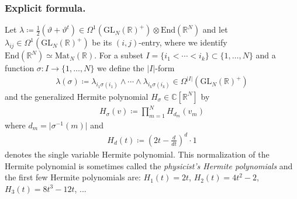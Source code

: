 \documentclass[a4paper,11pt]{amsart} %
\newcommand{\8}{\infty}
\newcommand{\GL}{\mathrm{GL}}
\newcommand{\R}{\mathbb{R}}
\newcommand{\C}{\mathbb{C}}
\newcommand{\End}{\mathrm{End}}
\newcommand{\Mat}{\mathrm{Mat}}
\theoremstyle{mytheoremstyle}
\theoremstyle{remark}
\numberwithin{equation}{section}
\begin{document}
\subsubsection{Explicit formula.} Let $\lambda \coloneqq \frac{1}{2}(\vartheta+\vartheta^t) \in \Omega^1(\GL_N(\R)^+) \otimes \End(\R^{N})$ and let $\lambda_{ij} \in \Omega^1(\GL_N(\R)^+)$ be its $(i,j)$-entry, where we identify $\End(\R^{N}) \simeq \Mat_N(\R)$. For a subset $I=\{i_1 < \cdots <i_k\} \subset \{ 1, \dots, N \}$ and a function $\sigma \colon I \longrightarrow \{ 1, \dots, N \}$ we define the $\vert I \vert$-form
\begin{align}
    \lambda(\sigma) \coloneqq \lambda_{i_1\sigma(i_1)} \wedge  \cdots \wedge \lambda_{i_k\sigma(i_k)} \in \Omega^{\vert I \vert}(\GL_N(\R)^+)
\end{align}
and the generalized Hermite polynomial $H_\sigma \in \C[\R^{N}]$ by
\begin{align}
    H_\sigma(v)  \coloneqq \prod_{m=1}^NH_{d_m}(v_m)
\end{align}
where $d_m = \vert \sigma^{-1}(m) \vert$ and 
\begin{align}
H_d(t) \coloneqq \left (2t-\frac{d}{dt} \right )^d \cdot 1
\end{align} denotes the single variable Hermite polynomial.  This normalization of the Hermite polynomial is sometimes called the {\em physicist's Hermite polynomials} and the first few Hermite polynomials are: $H_1(t)=2t$, $H_2(t)=4t^2-2$, $H_3(t)=8t^3-12t$, ...
\end{document}
